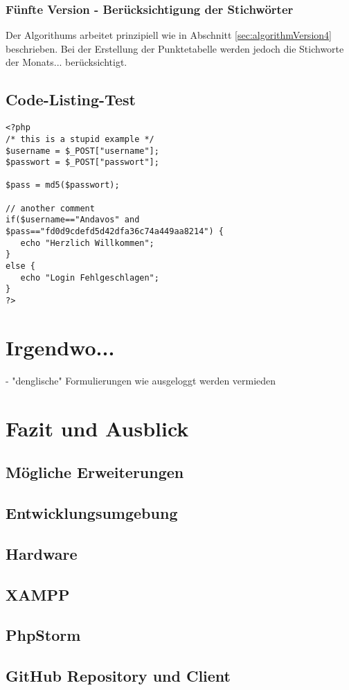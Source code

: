 \documentclass[12pt,a4paper,titlepage]{article} %
\begin{document}
\subsubsection{Fünfte Version - Berücksichtigung der Stichwörter}
\label{sec:algorithmVersion5}
Der Algorithums arbeitet prinzipiell wie in Abschnitt \ref{sec:algorithmVersion4} beschrieben. Bei der Erstellung der Punktetabelle werden jedoch die Stichworte der Monats... berücksichtigt.






\subsection{Code-Listing-Test}
\begin{lstlisting}
<?php
/* this is a stupid example */
$username = $_POST["username"];
$passwort = $_POST["passwort"];

$pass = md5($passwort);

// another comment
if($username=="Andavos" and
$pass=="fd0d9cdefd5d42dfa36c74a449aa8214") {
   echo "Herzlich Willkommen";
}
else {
   echo "Login Fehlgeschlagen";
}
?>
\end{lstlisting}

\clearpage
\newpage

\section{Irgendwo...}
- "denglische" Formulierungen wie ausgeloggt werden vermieden

\section{Fazit und Ausblick} %



\subsection{Mögliche Erweiterungen}



\clearpage
\newpage
\begin{appendix}


\section{Entwicklungsumgebung}
\subsection{Hardware}
\subsection{XAMPP}
\subsection{PhpStorm}
\subsection{GitHub Repository und Client}
\end{appendix}
\end{document}
